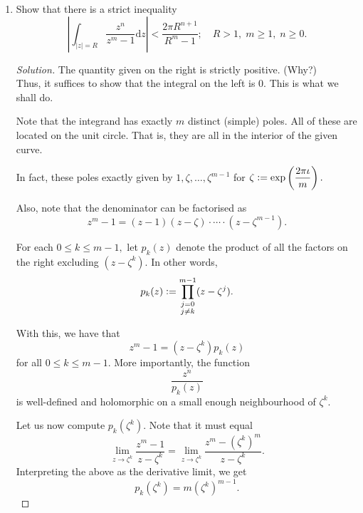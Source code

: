 \documentclass[12pt]{article}
\theoremstyle{definition}
\numberwithin{thm}{section}
\newenvironment{soln}{\begin{proof}[Solution]}{\end{proof}}
\begin{document}
\begin{enumerate}
	\item Show that there is a strict inequality
	\begin{equation*} 
		\left|\int_{|z| = R}^{} \dfrac{z^n}{z^m - 1} {\mathrm{d}}z\right| < \dfrac{2\pi R^{n + 1}}{R^{m} - 1}; \quad R > 1,\; m \ge 1,\; n \ge 0.
	\end{equation*}

	\begin{soln}
		The quantity given on the right is strictly positive. (Why?)\\
		Thus, it suffices to show that the integral on the left is $0.$ This is what we shall do.

		Note that the integrand has exactly $m$ distinct (simple) poles. All of these are located on the unit circle. That is, they are all in the interior of the given curve.

		In fact, these poles exactly given by $1, \zeta, \ldots, \zeta^{m-1}$ for $\zeta\vcentcolon=\exp\left(\dfrac{2\pi\iota}{m}\right).$

		Also, note that the denominator can be factorised as
		\begin{equation*} 
			z^m - 1 = (z - 1)(z - \zeta)\cdot\cdots\cdot(z - \zeta^{m-1}).
		\end{equation*}

		For each $0 \le k \le m - 1,$ let $p_k(z)$ denote the product of all the factors on the right excluding $(z - \zeta^k).$ In other words,
		\begin{equation*} 
			p_k(z) \vcentcolon= \prod_{\substack{j = 0\\j\neq k}}^{m-1}(z - \zeta^j).
		\end{equation*}

		With this, we have that
		\begin{equation*} 
			z^m - 1 = (z - \zeta^k)p_k(z)
		\end{equation*}
		for all $0 \le k \le m-1.$ More importantly, the function
		\begin{equation*} 
			\dfrac{z^n}{p_k(z)}
		\end{equation*}
		is well-defined and holomorphic on a small enough neighbourhood of $\zeta^k.$

		Let us now compute $p_k(\zeta^k).$ Note that it must equal
		\begin{equation*} 
			\lim_{z\to \zeta^k}\dfrac{z^m - 1}{z - \zeta^k} = \lim_{z\to \zeta^k}\dfrac{z^m - (\zeta^k)^m}{z - \zeta^k}.
		\end{equation*}
		Interpreting the above as the derivative limit, we get
		\begin{equation*} 
			p_k(\zeta^k) = m\left(\zeta^k\right)^{m-1}.
		\end{equation*}	


\end{soln}
\end{enumerate}
\end{document}
